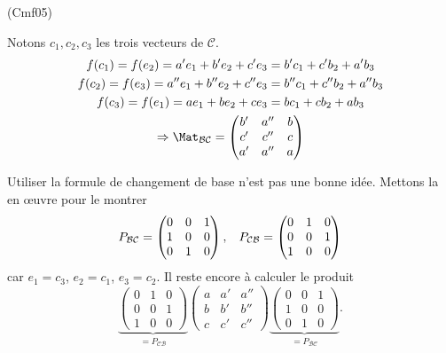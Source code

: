 \begin{tiny}(Cmf05)\end{tiny} Notons $c_1, c_2, c_3$ les trois vecteurs de $\mathcal{C}$.
\begin{multline*}
    f(c_1) = f(e_2) = a' e_1 + b'e_2 + c'e_3 = b'c_1 + c'b_2 + a'b_3 \\
    f(c_2) = f(e_3) = a'' e_1 + b''e_2 + c''e_3 = b''c_1 + c''b_2 + a''b_3\\
    f(c_3) = f(e_1) = a e_1 + b e_2 + ce_3 = bc_1 + cb_2 + ab_3
 \\
\Rightarrow
\Mat_{\mathcal{B} \mathcal{C}} =
\begin{pmatrix}
 b' & a'' & b \\
 c' & c'' & c \\
 a' & a'' & a
\end{pmatrix}
\end{multline*}

Utiliser la formule de changement de base n'est pas une bonne idée. Mettons la en \oe{}uvre pour le montrer
\[
  P_{\mathcal{B} \mathcal{C}} =
\begin{pmatrix}
 0 & 0 & 1 \\
 1 & 0 & 0 \\
 0 & 1 & 0
\end{pmatrix}, \hspace{0.3cm}
  P_{\mathcal{C}\mathcal{B}} =
\begin{pmatrix}
 0 & 1 & 0 \\
 0 & 0 & 1 \\
 1 & 0 & 0
\end{pmatrix} 
\]
car $e_1 = c_3$, $e_2 = c_1$, $e_3 = c_2$. Il reste encore à calculer le produit
\[
\underset{= P_{\mathcal{C}\mathcal{B}}}{\underbrace{
\begin{pmatrix}
 0 & 1 & 0 \\
 0 & 0 & 1 \\
 1 & 0 & 0
\end{pmatrix} }}
  \begin{pmatrix}
 a & a' & a'' \\
 b & b' & b'' \\
 c & c' & c''
\end{pmatrix}
\underset{= P_{\mathcal{B} \mathcal{C}}}{\underbrace{
\begin{pmatrix}
 0 & 0 & 1 \\
 1 & 0 & 0 \\
 0 & 1 & 0
\end{pmatrix}}}.
\]
